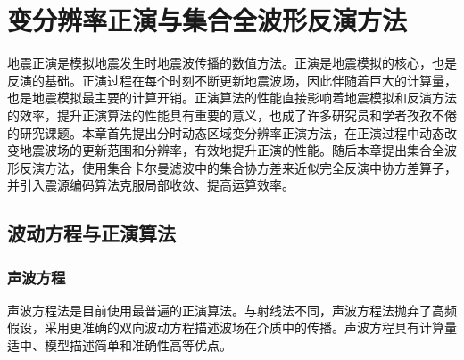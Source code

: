 \chapter{变分辨率正演与集合全波形反演方法} %
\label{cha:变分辨率正演与集合全波形反演方法}

地震正演是模拟地震发生时地震波传播的数值方法。正演是地震模拟的核心，也是反演的基础。正演过程在每个时刻不断更新地震波场，因此伴随着巨大的计算量，也是地震模拟最主要的计算开销。正演算法的性能直接影响着地震模拟和反演方法的效率，提升正演算法的性能具有重要的意义，也成了许多研究员和学者孜孜不倦的研究课题\cite{bednar2002limited,stork2013eliminating}。本章首先提出分时动态区域变分辨率正演方法，在正演过程中动态改变地震波场的更新范围和分辨率，有效地提升正演的性能。随后本章提出集合全波形反演方法，使用集合卡尔曼滤波中的集合协方差来近似完全反演中协方差算子，并引入震源编码算法克服局部收敛、提高运算效率。


\section{波动方程与正演算法} %

\subsection{声波方程} %
声波方程法是目前使用最普遍的正演算法。与射线法不同，声波方程法抛弃了高频假设，采用更准确的双向波动方程描述波场在介质中的传播。声波方程具有计算量适中、模型描述简单和准确性高等优点。

